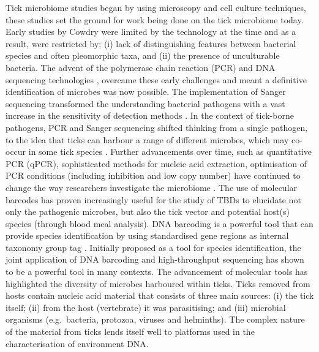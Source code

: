 \documentclass[a4paper, nobind]{templates/ociamthesis}
\begin{document}
Tick microbiome studies began by using microscopy and cell culture techniques, these studies set the ground for work being done on the tick microbiome today.
Early studies by Cowdry \autocite*{cowdryGroupMicroorganismsTransmitted1925} were limited by the technology at the time and as a result, were restricted by; (i) lack of distinguishing features between bacterial species and often pleomorphic taxa, and (ii) the presence of unculturable bacteria.
The advent of the polymerase chain reaction (PCR) \autocite{mullisSpecificSynthesisDNA1987} and DNA sequencing technologies \autocite{sangerDNASequencingChaintermination1977}, overcame these early challenges and meant a definitive identification of microbes was now possible.
The implementation of Sanger sequencing transformed the understanding bacterial pathogens with a vast increase in the sensitivity of detection methods \autocite{chakravortyDetailedAnalysis16S2007,macdonaldFrameworkDevelopingValidating2016}.
In the context of tick-borne pathogens, PCR and Sanger sequencing shifted thinking from a single pathogen, to the idea that ticks can harbour a range of different microbes, which may co-occur in some tick species \autocite{brouquiGuidelinesDiagnosisTickborne2004,scolesPhylogeneticAnalysisFrancisellalike2004,parolaTickFleaborneRickettsial2005}.
Further advancements over time, such as quantitative PCR (qPCR), sophisticated methods for nucleic acid extraction, optimisation of PCR conditions (including inhibition and low copy number) have continued to change the way researchers investigate the microbiome \autocite{hoffmannAnalysisTickSurface2020,koloAnaplasmaPhagocytophilumOther2020}.
The use of molecular barcodes has proven increasingly useful for the study of TBDs to elucidate not only the pathogenic microbes, but also the tick vector and potential host(s) species (through blood meal analysis). DNA barcoding is a powerful tool that can provide species identification by using standardised gene regions as internal taxonomy group tag \autocite{hubertDNABarcodingSpecies2015}. Initially proposed as a tool for species identification, the joint application of DNA barcoding and high-throughput sequencing has shown to be a powerful tool in many contexts.
The advancement of molecular tools has highlighted the diversity of microbes harboured within ticks.
Ticks removed from hosts contain nucleic acid material that consists of three main sources: (i) the tick itself; (ii) from the host (vertebrate) it was parasitising; and (iii) microbial organisms (e.g.~bacteria, protozoa, viruses and helminths).
The complex nature of the material from ticks lends itself well to platforms used in the characterisation of environment DNA.
\end{document}
